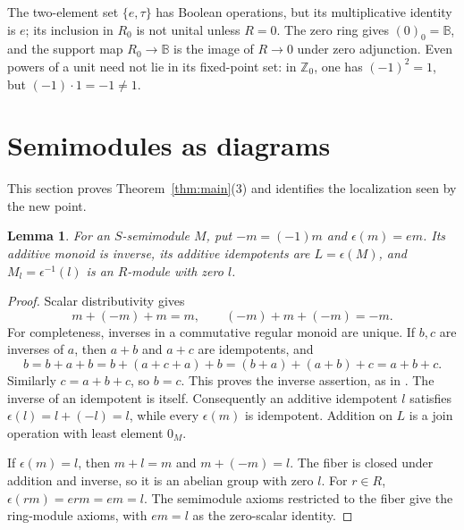 \documentclass[11pt]{amsart}
\newcommand{\B}{\mathbb B}
\newcommand{\Z}{\mathbb Z}
\newtheorem{lemma}[theorem]{Lemma}
\theoremstyle{definition}
\theoremstyle{remark}
\begin{document}
The two-element set $\{e,\tau\}$ has Boolean operations, but its multiplicative identity is $e$; its inclusion in $R_0$ is not unital unless $R=0$. The zero ring gives $(0)_0=\B$, and the support map $R_0\to\B$ is the image of $R\to0$ under zero adjunction. Even powers of a unit need not lie in its fixed-point set: in $\Z_0$, one has $(-1)^2=1$, but $(-1)\cdot1=-1\ne1$.

\section{Semimodules as diagrams}\label{sec:diagrams}
This section proves Theorem~\ref{thm:main}(3) and identifies the localization seen by the new point.

\begin{lemma}\label{lem:fibers}
For an $S$-semimodule $M$, put $-m=(-1)m$ and $\epsilon(m)=em$. Its additive monoid is inverse, its additive idempotents are $L=\epsilon(M)$, and $M_l=\epsilon^{-1}(l)$ is an $R$-module with zero $l$.
\end{lemma}
\begin{proof}
Scalar distributivity gives
\[
 m+(-m)+m=m,\qquad (-m)+m+(-m)=-m.
\]
For completeness, inverses in a commutative regular monoid are unique. If $b,c$ are inverses of $a$, then $a+b$ and $a+c$ are idempotents, and
\[
 b=b+a+b=b+(a+c+a)+b=(b+a)+(a+b)+c=a+b+c.
\]
Similarly $c=a+b+c$, so $b=c$. This proves the inverse assertion, as in \cite[Proposition~6.1]{FGJM}. The inverse of an idempotent is itself. Consequently an additive idempotent $l$ satisfies $\epsilon(l)=l+(-l)=l$, while every $\epsilon(m)$ is idempotent. Addition on $L$ is a join operation with least element $0_M$.

If $\epsilon(m)=l$, then $m+l=m$ and $m+(-m)=l$. The fiber is closed under addition and inverse, so it is an abelian group with zero $l$. For $r\in R$, $\epsilon(rm)=erm=em=l$. The semimodule axioms restricted to the fiber give the ring-module axioms, with $em=l$ as the zero-scalar identity.
\end{proof}
\end{document}
